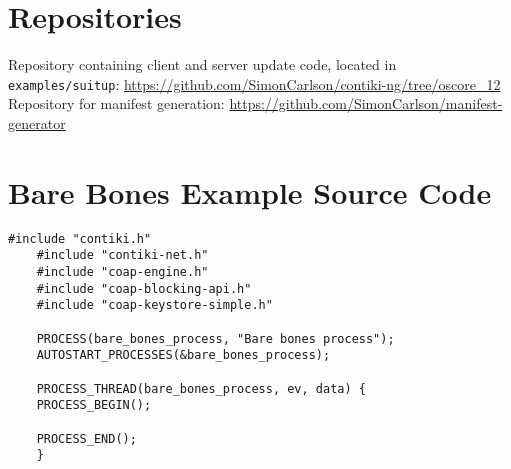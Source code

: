 \documentclass{kththesis}
\begin{document}


\chapter{Repositories}
\label{app:repos}
Repository containing client and server update code, located in \texttt{examples/suitup}:
\url{https://github.com/SimonCarlson/contiki-ng/tree/oscore_12}\\

\noindent Repository for manifest generation:
\url{https://github.com/SimonCarlson/manifest-generator}

\chapter{Bare Bones Example Source Code}
\label{app:bare-bones}
\begin{lstlisting}[language=manifest, caption={Bare bones Contiki-NG example.}, label=lst:bare-bones]
    #include "contiki.h"
    #include "contiki-net.h"
    #include "coap-engine.h"
    #include "coap-blocking-api.h"
    #include "coap-keystore-simple.h"

    PROCESS(bare_bones_process, "Bare bones process");
    AUTOSTART_PROCESSES(&bare_bones_process);

    PROCESS_THREAD(bare_bones_process, ev, data) {
    PROCESS_BEGIN();

    PROCESS_END();
    }
\end{lstlisting}
\end{document}
